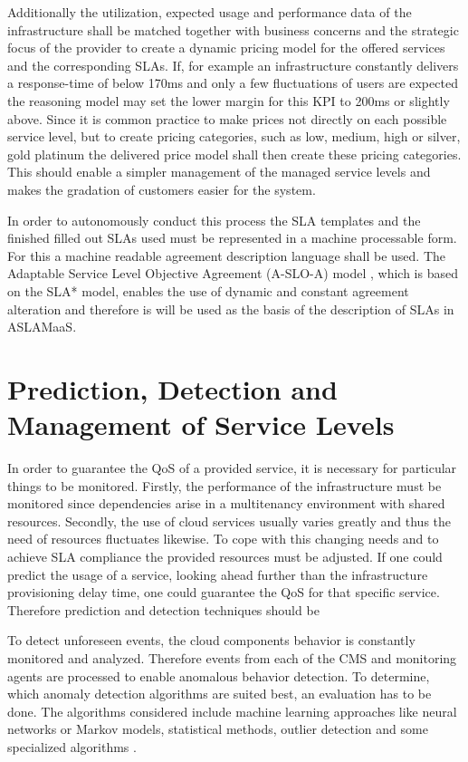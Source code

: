 Additionally the utilization, expected usage and performance data of the infrastructure shall be matched together with business concerns and the strategic focus of the provider to create a dynamic pricing model for the offered services and the corresponding SLAs. If, for example an infrastructure constantly delivers a response-time of below 170ms and only a few fluctuations of users are expected the reasoning model may set the lower margin for this KPI to 200ms or slightly above. Since it is common practice to make prices not directly on each possible service level, but to create pricing categories, such as low, medium, high or silver, gold platinum the delivered price model shall then create these pricing categories. This should enable a simpler management of the managed service levels and makes the gradation of customers easier for the system.
  
In order to autonomously conduct this process the SLA templates and the finished filled out SLAs used must be represented in a machine processable form. For this a machine readable agreement description language shall be used. The Adaptable Service Level Objective Agreement (A-SLO-A) model \cite{A-SLO-A}, which is based on the SLA* model, enables the use of dynamic and constant agreement alteration and therefore is will be used as the basis of the description of SLAs in ASLAMaaS.


\section{Prediction, Detection and Management of Service Levels} \label{SLA prediction}
In order to guarantee the QoS of a provided service, it is necessary for particular things to be monitored. Firstly, the performance of the infrastructure must be monitored since dependencies arise in a multitenancy environment with shared resources. Secondly, the use of cloud services usually varies greatly and thus the need of resources fluctuates likewise. To cope with this changing needs and to achieve SLA  compliance the provided resources must be adjusted. If one could predict the usage of a service, looking ahead further than the infrastructure provisioning delay time, one could guarantee the QoS for that specific service. Therefore prediction and detection techniques should be 

To detect unforeseen events, the cloud components behavior is constantly monitored and analyzed. Therefore events from each of the CMS and monitoring agents are processed to enable anomalous behavior detection. 
To determine, which anomaly detection algorithms are suited best, an evaluation has to be done. The algorithms considered include machine learning approaches like neural networks or Markov models, statistical methods, outlier detection and some specialized algorithms \cite{Anomaly2}. %


